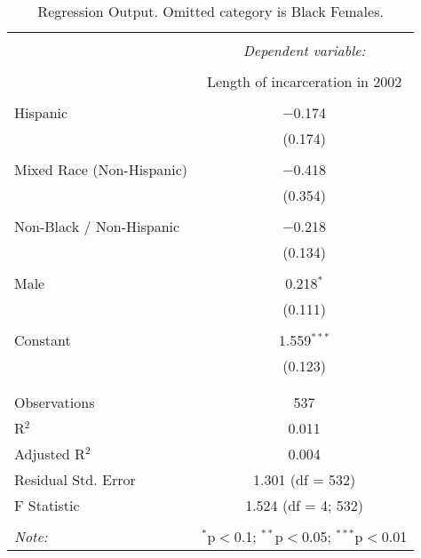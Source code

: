 
\begin{table}[!htbp] \centering 
  \caption{Regression Output. Omitted category is Black Females.} 
  \label{tab:regression} 
\begin{tabular}{@{\extracolsep{5pt}}lc} 
\\[-1.8ex]\hline 
\hline \\[-1.8ex] 
 & \multicolumn{1}{c}{\textit{Dependent variable:}} \\ 
\cline{2-2} 
\\[-1.8ex] & Length of incarceration in 2002 \\ 
\hline \\[-1.8ex] 
 Hispanic & $-$0.174 \\ 
  & (0.174) \\ 
  & \\ 
 Mixed Race (Non-Hispanic) & $-$0.418 \\ 
  & (0.354) \\ 
  & \\ 
 Non-Black / Non-Hispanic & $-$0.218 \\ 
  & (0.134) \\ 
  & \\ 
 Male & 0.218$^{*}$ \\ 
  & (0.111) \\ 
  & \\ 
 Constant & 1.559$^{***}$ \\ 
  & (0.123) \\ 
  & \\ 
\hline \\[-1.8ex] 
Observations & 537 \\ 
R$^{2}$ & 0.011 \\ 
Adjusted R$^{2}$ & 0.004 \\ 
Residual Std. Error & 1.301 (df = 532) \\ 
F Statistic & 1.524 (df = 4; 532) \\ 
\hline 
\hline \\[-1.8ex] 
\textit{Note:}  & \multicolumn{1}{r}{$^{*}$p$<$0.1; $^{**}$p$<$0.05; $^{***}$p$<$0.01} \\ 
\end{tabular} 
\end{table} 
